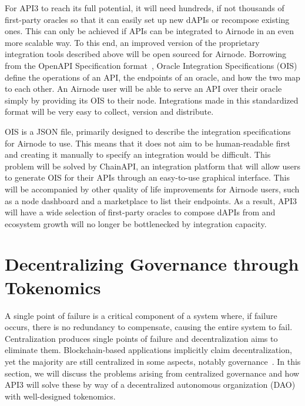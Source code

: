 \documentclass[11pt]{article}
\begin{document}
For API3 to reach its full potential, it will need hundreds, if not thousands of first-party oracles so that it can easily set up new dAPIs or recompose existing ones.
This can only be achieved if APIs can be integrated to Airnode in an even more scalable way.
To this end, an improved version of the proprietary integration tools described above will be open sourced for Airnode.
Borrowing from the OpenAPI Specification format~\cite{oas}, Oracle Integration Specifications (OIS) define the operations of an API, the endpoints of an oracle, and how the two map to each other.
An Airnode user will be able to serve an API over their oracle simply by providing its OIS to their node.
Integrations made in this standardized format will be very easy to collect, version and distribute.

OIS is a JSON file, primarily designed to describe the integration specifications for Airnode to use.
This means that it does not aim to be human-readable first and creating it manually to specify an integration would be difficult.
This problem will be solved by ChainAPI, an integration platform that will allow users to generate OIS for their APIs through an easy-to-use graphical interface.
This will be accompanied by other quality of life improvements for Airnode users, such as a node dashboard and a marketplace to list their endpoints.
As a result, API3 will have a wide selection of first-party oracles to compose dAPIs from and ecosystem growth will no longer be bottlenecked by integration capacity.

\section{Decentralizing Governance through Tokenomics}
\label{sec:decentralizing-governance-through-tokenomics}

A single point of failure is a critical component of a system where, if failure occurs, there is no redundancy to compensate, causing the entire system to fail.
Centralization produces single points of failure and decentralization aims to eliminate them.
Blockchain-based applications implicitly claim decentralization, yet the majority are still centralized in some aspects, notably governance~\cite{Walch:2019}.
In this section, we will discuss the problems arising from centralized governance and how API3 will solve these by way of a decentralized autonomous organization (DAO)~\cite{buterin:2014b} with well-designed tokenomics.
\end{document}
